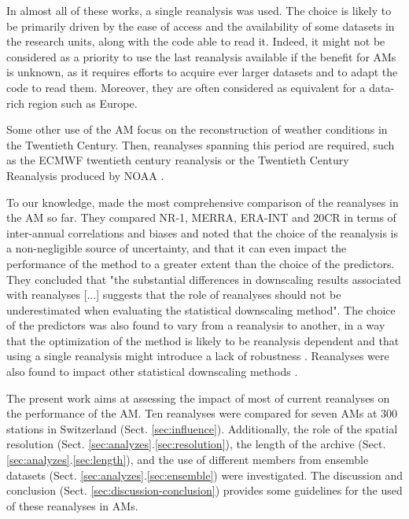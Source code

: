 \documentclass{ametsoc}
\begin{document}
In almost all of these works, a single reanalysis was used. The choice is likely to be primarily driven by the ease of access and the availability of some datasets in the research units, along with the code able to read it. Indeed, it might not be considered as a priority to use the last reanalysis available if the benefit for AMs is unknown, as it requires efforts to acquire ever larger datasets and to adapt the code to read them. Moreover, they are often considered as equivalent for a data-rich region such as Europe.

Some other use of the AM focus on the reconstruction of weather conditions in the Twentieth Century. Then, reanalyses spanning this period are required, such as the ECMWF twentieth century reanalysis \citep[ERA-20C --][]{Poli2016} or the Twentieth Century Reanalysis \citep[20CR --][]{Compo2011} produced by NOAA \citep[for example,][]{Kuentz2015, Caillouet2016, Brigode2016, Bonnet2017}. 

To our knowledge, \citet{Dayon2015} made the most comprehensive comparison of the reanalyses in the AM so far. They compared NR-1, MERRA, ERA-INT and 20CR in terms of inter-annual correlations and biases and noted that the choice of the reanalysis is a non-negligible source of uncertainty, and that it can even impact the performance of the method to a greater extent than the choice of the predictors. They concluded that "the substantial differences in downscaling results associated with reanalyses [...] suggests that the role of reanalyses should not be underestimated when evaluating the statistical downscaling method". The choice of the predictors was also found to vary from a reanalysis to another, in a way that the optimization of the method is likely to be reanalysis dependent and that using a single reanalysis might introduce a lack of robustness \citep{Dayon2015}. Reanalyses were also found to impact other statistical downscaling methods \citep[e.g.][]{Koukidis2009}.

The present work aims at assessing the impact of most of current reanalyses on the performance of the AM. Ten reanalyses were compared for seven AMs at 300 stations in Switzerland (Sect. \ref{sec:influence}). Additionally, the role of the spatial resolution (Sect. \ref{sec:analyzes}.\ref{sec:resolution}), the length of the archive (Sect. \ref{sec:analyzes}.\ref{sec:length}), and the use of different members from ensemble datasets (Sect. \ref{sec:analyzes}.\ref{sec:ensemble}) were investigated. The discussion and conclusion (Sect. \ref{sec:discussion-conclusion}) provides some guidelines for the used of these reanalyses in AMs.
\end{document}
